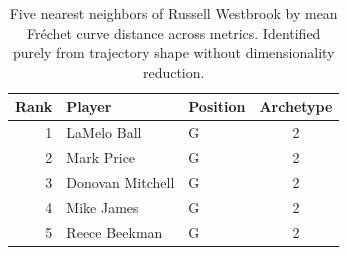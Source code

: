 \begin{table}[htbp]
  \centering\small
  \begin{tabular}{rllc}
    \toprule
    Rank & Player & Position & Archetype \\
    \midrule
    1 & LaMelo Ball & G & 2 \\
    2 & Mark Price & G & 2 \\
    3 & Donovan Mitchell & G & 2 \\
    4 & Mike James & G & 2 \\
    5 & Reece Beekman & G & 2 \\
    \bottomrule
  \end{tabular}
  \caption{Five nearest neighbors of Russell Westbrook by mean Fr\'{e}chet curve distance across metrics. Identified purely from trajectory shape without dimensionality reduction.}
  \label{tab:Russell_Westbrook_frechet_curve_neighbors}
\end{table}

